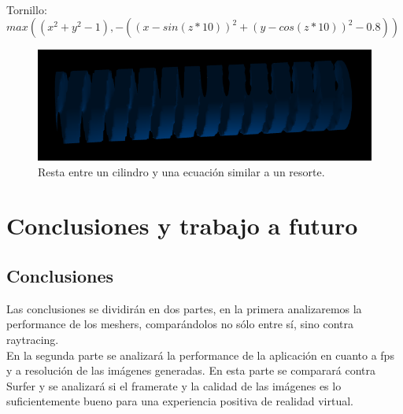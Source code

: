 \documentclass[12pt]{article}
\begin{document}
\\Tornillo: $max((x^2 + y^2 - 1) ,-((x-sin(z*10) )^2 + (y -cos (z*10))^2 -0.8))$ \\
\begin{figure}[h!]
\includegraphics[width=0.7\linewidth,center]{g5.png}
\caption{Resta entre un cilindro y una ecuación similar a un resorte.}
\end{figure}

\clearpage
\section{Conclusiones y trabajo a futuro}
\subsection{Conclusiones}
Las conclusiones se dividirán en dos partes, en la primera analizaremos la performance de los meshers, comparándolos no sólo entre sí, sino contra raytracing. 
\\En la segunda parte se analizará la performance de la aplicación en cuanto a fps y a resolución de las imágenes generadas. En esta parte se comparará contra Surfer y se analizará si el framerate y la calidad de las imágenes es lo suficientemente bueno para una experiencia positiva de realidad virtual.
\end{document}
